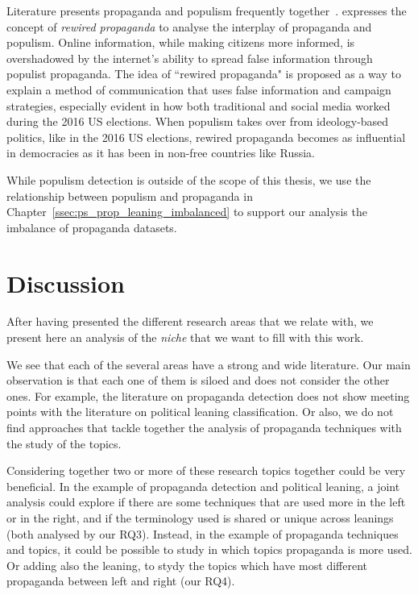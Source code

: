 Literature presents propaganda and populism frequently together~\cite{oates2021rewired,tumber2021routledge,pasquino2008populism}.
\citet{oates2021rewired} expresses the
concept of \emph{rewired propaganda} to analyse the interplay of propaganda and populism. Online information, while making citizens more informed, is overshadowed by the internet's ability to spread false information through populist propaganda.
The idea of ``rewired propaganda" is proposed as a way to explain a method of communication that uses false information and campaign strategies, especially evident in how both traditional and social media worked during the 2016 US elections.
When populism takes over from ideology-based politics, like in the 2016 US elections, rewired propaganda becomes as influential in democracies as it has been in non-free countries like Russia.

While populism detection is outside of the scope of this thesis, we use the relationship between populism and propaganda in Chapter~\ref{ssec:ps_prop_leaning_imbalanced} to support our analysis the imbalance of propaganda datasets.




\section{\statusgreen Discussion}
\label{sec:lit_discussion}

After having presented the different research areas that we relate with, we present here an analysis of the \emph{niche} that we want to fill with this work.

We see that each of the several areas have a strong and wide literature.
Our main observation is that each one of them is siloed and does not consider the other ones.
For example, the literature on propaganda detection does not show meeting points with the literature on political leaning classification.
Or also, we do not find approaches that tackle together the analysis of propaganda techniques with the study of the topics.

Considering together two or more of these research topics together could be very beneficial.
In the example of propaganda detection and political leaning, a joint analysis could explore if there are some techniques that are used more in the left or in the right, and if the terminology used is shared or unique across leanings (both analysed by our RQ3).
Instead, in the example of propaganda techniques and topics, it could be possible to study in which topics propaganda is more used. Or adding also the leaning, to stydy the topics which have most different propaganda between left and right (our RQ4). 

